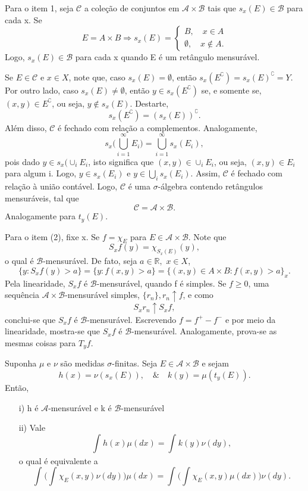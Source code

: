 \documentclass[measure_theory.tex]{subfiles}
\begin{document}
\begin{proof*}
	Para o item 1, seja \(\mathcal{C}\) a coleção de conjuntos em \(\mathcal{A}\times \mathcal{B}\) tais que \(s_x(E)\in \mathcal{B}\) para cada x. Se
	\[
		E = A\times B \Rightarrow s_x(E)  = \left\{\begin{array}{ll}
			B,\quad x\in A \\
			\emptyset ,\quad x\not\in A.
		\end{array}\right.
	\]
	Logo, \(s_x(E)\in \mathcal{B}\) para cada x quando E é um retângulo mensurável.

	Se \(E\in \mathcal{C}\) e \(x\in X\), note que, caso \(s_x(E) = \emptyset \), então \(s_x(E ^{\complement}) = s_x(E)^{\complement} = Y.\) Por outro lado, caso \(s_x(E)\neq\emptyset\),
	então \(y\in s_x(E ^{\complement})\) se, e somente se, \((x, y)\in E ^{\complement}\), ou seja, \(y\not\in s_x(E).\) Destarte,
	\[
		s_x(E ^{\complement}) = (s_x(E))^{\complement}.
	\]
	Além disso, \(\mathcal{C}\) é fechado com relação a complementos. Analogamente,
	\[
		s_x \biggl( \bigcup_{i=1}^{\infty}E_{i}\biggr) = \bigcup_{i=1}^{\infty}s_x(E_{i}),
	\]
	pois dado \(y\in s_x(\cup_i E_{i}\), isto significa que \((x, y)\in \cup_i E_{i}\), ou seja, \((x, y)\in E_{i}\) para algum i. Logo, \(y\in s_x(E_{i})\) e \(y\in \bigcup_{i}^{}s_{x}(E_{i}).\)
	Assim, \(\mathcal{C}\) é fechado com relação à união contável. Logo, \(\mathcal{C}\) é uma \(\sigma \)-álgebra contendo retângulos mensuráveis, tal que
	\[
		\mathcal{C} = \mathcal{A}\times \mathcal{B}.
	\]
	Analogamente para \(t_y(E).\)

	Para o item (2), fixe x. Se \(f=\chi_{E}\) para \(E\in \mathcal{A}\times \mathcal{B}.\) Note que
	\[
		S_xf(y) = \chi_{S_x(E)}(y),
	\]
	o qual é \(\mathcal{B}\)-mensurável. De fato, seja \(a\in \mathbb{R},\) \(x\in X\),
	\[
		\{y: S_{x}f(y) > a\} = \{y:f(x, y) > a\} = \{(x, y)\in A\times B: f(x, y) > a\}_{x}.
	\]
	Pela linearidade, \(S_{x}f\) é \(\mathcal{B}\)-mensurável, quando f é simples. Se \(f\geq 0\), uma sequência \(\mathcal{A}\times \mathcal{B}\)-mensurável simples, \(\{r_{n}\}, r_{n}\uparrow f\), e como
	\[
		S_xr_{n}\uparrow S_{x}f,
	\]
	conclui-se que \(S_xf\) é \(\mathcal{B}\)-mensurável. Escrevendo \(f=f^{+}-f^{-}\) e por meio da linearidade, mostra-se que \(S_{x}f\) é \(\mathcal{B}\)-mensurável. Analogamente, prova-se as mesmas coisas
	para \(T_{y}f\). \qedsymbol
\end{proof*}
\begin{prop*}

	Suponha \(\mu \) e \(\nu\) são medidas \(\sigma \)-finitas. Seja \(E\in \mathcal{A}\times \mathcal{B}\) e sejam
	\[
		h(x) = \nu(s_x(E)),\quad\&\quad k(y) = \mu (t_y(E)).
	\]
	Então,
	\begin{itemize}
		\item[i)] h é \(\mathcal{A}\)-mensurável e k é \(\mathcal{B}\)-mensurável
		\item[ii)] Vale
		      \[
			      \int_{}h(x) \mu (dx) = \int_{}^{}k(y)\nu(dy),
		      \]
		      o qual é equivalente a
		      \[
			      \int_{}^{}\biggl(\int_{}^{}\chi_{E}(x, y)\nu(dy)\biggr)\mu (dx) = \int_{}^{}\biggl(\int_{}^{}\chi_{E}(x, y)\mu (dx)\biggr)\nu(dy).
		      \]
	\end{itemize}
\end{prop*}
\end{document}
